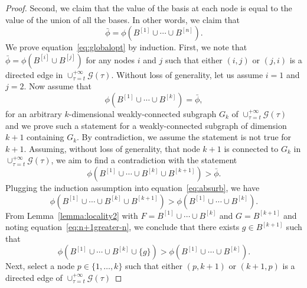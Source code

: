 \documentclass[onecolumn,journal,letterpaper]{IEEEtran}
\newcommand{\union}{\cup}
\newcommand{\GG}{\mathcal{G}}
\newcommand{\until}[1]{\{1,\dots,#1\}}
\newcommand{\supind}[2]{{#1}^{[#2]}}
\begin{document}
\begin{proof}
   Second, we claim that the value of the basis at each node is equal to
   the value of the union of all the bases. In other words, we claim that
   \begin{equation}
     \label{eq:globalopt}
     \bar{\phi} = \phi(\supind{B}{1}\union\cdots \union \supind{B}{n}).
   \end{equation}
   We prove equation~\eqref{eq:globalopt} by induction.  First, we note
   that $\bar{\phi} = \phi(\supind{B}{i}\union\supind{B}{j})$ for any nodes
   $i$ and $j$ such that either $(i,j)$ or $(j,i)$ is a directed edge in
   $\union_{\tau=t}^{+\infty} \GG(\tau)$.  Without loss of generality, let
   us assume $i=1$ and $j=2$.  Now assume that
   \begin{equation}
     \label{eq:no-idea}
     \phi(\supind{B}{1}\union\cdots \union \supind{B}{k})
     = \bar{\phi},
   \end{equation}
   for an arbitrary $k$-dimensional weakly-connected subgraph $G_k$ of
   $\union_{\tau=t}^{+\infty} \GG(\tau)$ and we prove such a statement for
   a weakly-connected subgraph of dimension $k+1$ containing $G_k$.  By
   contradiction, we assume the statement is not true for $k+1$.  Assuming,
   without loss of generality, that node $k+1$ is connected to $G_k$ in
   $\union_{\tau=t}^{+\infty} \GG(\tau)$, we aim to find a contradiction
   with the statement
   \begin{equation}
     \label{eq:absurb}
     \phi(\supind{B}{1}\union\cdots \union \supind{B}{k}
     \union \supind{B}{k+1} )
     > \bar{\phi}.
   \end{equation}
   Plugging the induction assumption into equation~\eqref{eq:absurb}, we
   have
   \begin{equation}
     \label{eq:n+1greater-n}
     \phi(\supind{B}{1}\union\cdots \union \supind{B}{k} \union
     \supind{B}{k+1} ) >
     \phi(\supind{B}{1}\union\cdots \union \supind{B}{k}).
   \end{equation}
   From Lemma~\ref{lemma:locality2} with $F=\supind{B}{1}\union\cdots
   \union \supind{B}{k}$ and $G=\supind{B}{k+1}$ and noting
   equation~\eqref{eq:n+1greater-n}, we conclude that there exists
   $g\in\supind{B}{k+1}$ such that
   \begin{equation}
     \label{eq:three}
     \phi(\supind{B}{1}\union\cdots \union
     \supind{B}{k}\union\{g\}) > \phi(\supind{B}{1}\union\cdots \union
     \supind{B}{k}).
   \end{equation}
   Next, select a node $p\in\until{k}$ such that either $(p,k+1)$ or
   $(k+1,p)$ is a directed edge of $\union_{\tau=t}^{+\infty} \GG(\tau)$

\end{proof}
\end{document}
